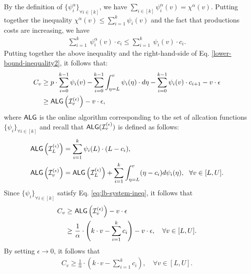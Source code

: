 By the definition of ${\{\psi^{\alpha}_{i}\}}_{\forall i \in [k]}$, we have $\sum_{i \in [k]} \psi^{\alpha}_{i}(v) = \chi^{\alpha}(v) $. Putting together the inequality $\chi^{\alpha}(v)\leq \sum_{i=1}^{k} \psi_{i}(v)$ and the fact that productions costs are increasing, we have
\begin{align*}
    \sum_{i=1}^{k} \ \psi^{\alpha}_{i}(v) \cdot  c_{i} \leq \sum_{i=1}^{k} \ \psi_{i}(v) \cdot  c_{i}.
\end{align*}
Putting together the above inequality and the right-hand-side of Eq. \eqref{lower-bound-inequality2}, it follows that:
\begin{align*}
    C_{v} & \ge p \cdot \sum_{i=0}^{k-1} \psi_{i}(v) - \sum_{i=0}^{k-1} \int_{\eta =L}^{v}  \psi_{i}(\eta)  \cdot d\eta -  \sum_{i=0}^{k-1} \psi_{i}(v) \cdot  c_{i+1}  - v \cdot \epsilon  \\
    &  \ge \textsf{ALG}\left(\mathcal{I}^{(\epsilon)}_{v}\right) - v \cdot \epsilon,
\end{align*}
where $\textsf{ALG}$ is the online algorithm corresponding to the set of allcation functions $\{\psi_{i}\}_{\forall i \in [k]}$ and recall that $\textsf{ALG}(\mathcal{I}^{(\epsilon)}_{v})$ is defined as follows:
\begin{align*}
& \textsf{ALG}\left(\mathcal{I}^{(\epsilon)}_{L}\right) = \sum_{i=1}^{k} \psi_{i}(L) \cdot (L - c_{i}), \\
& \textsf{ALG}\left(\mathcal{I}^{(\epsilon)}_{v}\right) =  \textsf{ALG}\left(\mathcal{I}^{(\epsilon)}_{L}\right) + \sum_{i=1}^{k} \int_{\eta =L}^{v} (\eta - c_{i} )d\psi_{i}(\eta),\ \  \forall v \in [L,U].
\end{align*}
Since ${\{\psi_{i}\}}_{\forall i \in [k]}$ satisfy Eq. \eqref{eq:lb-system-ineq}, it follows that
\begin{align*}
    C_{v}  \ge\ & \textsf{ALG}\left(\mathcal{I}^{(\epsilon)}_{v}\right) - v \cdot \epsilon \\
    \ge\ & \frac{1}{\alpha} \cdot \left(k \cdot v - \sum_{i=1}^{k} c_{i}\right) - v \cdot \epsilon,  \quad \forall v \in [L,U]. 
\end{align*}
By setting $\epsilon \rightarrow 0 $, it follows that
\begin{align*}
    C_{v}  \ge \frac{1}{\alpha} \cdot \left(k \cdot v - \sum_{i=1}^{k} c_{i} \right), \quad \forall v \in [L,U]. 
\end{align*}

